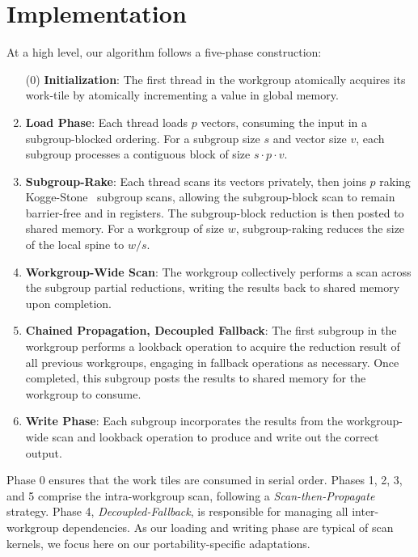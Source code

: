 \documentclass[sigconf]{acmart}
\begin{document}
\section{Implementation}
At a high level, our algorithm follows a five-phase construction:
\begin{enumerate}
  \item[(0)] \textbf {Initialization}: The first thread in the workgroup atomically acquires its work-tile by atomically incrementing a value in global memory.
  \item \textbf{Load Phase}: Each thread loads $p$ vectors, consuming the input in a subgroup-blocked ordering. For a subgroup size $s$ and vector size $v$, each subgroup processes a contiguous block of size $s \cdot p \cdot v$.
  \item \textbf{Subgroup-Rake}: Each thread scans its vectors privately, then joins $p$ raking Kogge-Stone~\cite{5009159} subgroup scans,
        allowing the subgroup-block scan to remain barrier-free and in registers. The subgroup-block reduction is then posted to shared memory. For a workgroup of size $w$, subgroup-raking reduces the size of the local spine to $w/s$.
  \item \textbf{Workgroup-Wide Scan}: The workgroup collectively performs a scan across the subgroup partial reductions, writing the results back to shared memory upon completion.
  \item \textbf{Chained Propagation, Decoupled Fallback}: The first subgroup in the workgroup performs a lookback operation to acquire the reduction result of all previous workgroups, engaging in fallback operations as necessary. Once completed, this subgroup posts the results to shared memory for the workgroup to consume.
  \item \textbf{Write Phase}: Each subgroup incorporates the results from the workgroup-wide scan and lookback operation to produce and write out the correct output.
\end{enumerate}
Phase 0 ensures that the work tiles are consumed in serial order. Phases 1, 2, 3, and 5 comprise the intra-workgroup scan, following a \emph{Scan-then-Propagate} strategy. Phase 4, \emph{Decoupled-Fallback}, is responsible for managing all inter-workgroup dependencies. As our loading and writing phase are typical of scan kernels, we focus here on our portability-specific adaptations.
\end{document}

